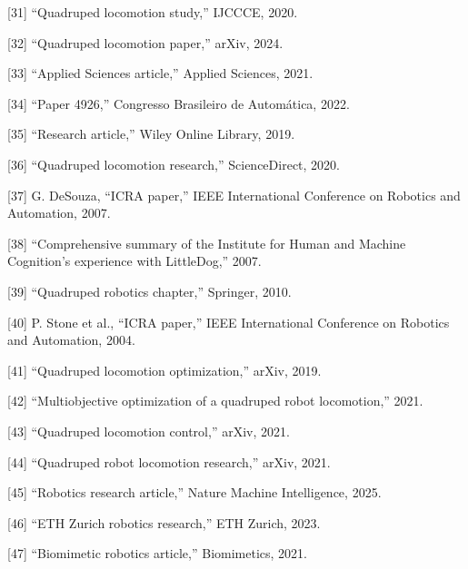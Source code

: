 [31] “Quadruped locomotion study,” IJCCCE, 2020.

[32] “Quadruped locomotion paper,” arXiv, 2024.

[33] “Applied Sciences article,” Applied Sciences, 2021.

[34] “Paper 4926,” Congresso Brasileiro de Automática, 2022.

[35] “Research article,” Wiley Online Library, 2019.

[36] “Quadruped locomotion research,” ScienceDirect, 2020.

[37] G. DeSouza, “ICRA paper,” IEEE International Conference on Robotics and Automation, 2007.

[38] “Comprehensive summary of the Institute for Human and Machine Cognition's experience with LittleDog,” 2007.

[39] “Quadruped robotics chapter,” Springer, 2010.

[40] P. Stone et al., “ICRA paper,” IEEE International Conference on Robotics and Automation, 2004.

[41] “Quadruped locomotion optimization,” arXiv, 2019.

[42] “Multiobjective optimization of a quadruped robot locomotion,” 2021.

[43] “Quadruped locomotion control,” arXiv, 2021.

[44] “Quadruped robot locomotion research,” arXiv, 2021.

[45] “Robotics research article,” Nature Machine Intelligence, 2025.

[46] “ETH Zurich robotics research,” ETH Zurich, 2023.

[47] “Biomimetic robotics article,” Biomimetics, 2021.


























